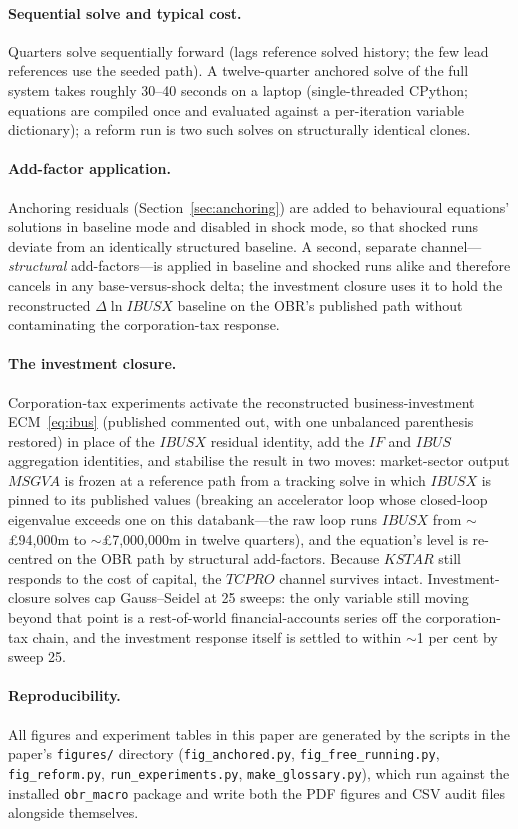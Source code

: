 \paragraph{Sequential solve and typical cost.} Quarters solve sequentially forward (lags reference solved history; the few lead references use the seeded path). A twelve-quarter anchored solve of the full system takes roughly 30--40 seconds on a laptop (single-threaded CPython; equations are compiled once and evaluated against a per-iteration variable dictionary); a reform run is two such solves on structurally identical clones.

\paragraph{Add-factor application.} Anchoring residuals (Section~\ref{sec:anchoring}) are added to behavioural equations' solutions in baseline mode and disabled in shock mode, so that shocked runs deviate from an identically structured baseline. A second, separate channel---\emph{structural} add-factors---is applied in baseline and shocked runs alike and therefore cancels in any base-versus-shock delta; the investment closure uses it to hold the reconstructed $\Delta \ln IBUSX$ baseline on the OBR's published path without contaminating the corporation-tax response.

\paragraph{The investment closure.} Corporation-tax experiments activate the reconstructed business-investment ECM~\eqref{eq:ibus} (published commented out, with one unbalanced parenthesis restored) in place of the $IBUSX$ residual identity, add the $IF$ and $IBUS$ aggregation identities, and stabilise the result in two moves: market-sector output $MSGVA$ is frozen at a reference path from a tracking solve in which $IBUSX$ is pinned to its published values (breaking an accelerator loop whose closed-loop eigenvalue exceeds one on this databank---the raw loop runs $IBUSX$ from $\sim$\pounds 94{,}000m to $\sim$\pounds 7{,}000{,}000m in twelve quarters), and the equation's level is re-centred on the OBR path by structural add-factors. Because $KSTAR$ still responds to the cost of capital, the $TCPRO$ channel survives intact. Investment-closure solves cap Gauss--Seidel at 25 sweeps: the only variable still moving beyond that point is a rest-of-world financial-accounts series off the corporation-tax chain, and the investment response itself is settled to within $\sim$1 per cent by sweep 25.

\paragraph{Reproducibility.} All figures and experiment tables in this paper are generated by the scripts in the paper's \texttt{figures/} directory (\texttt{fig\_anchored.py}, \texttt{fig\_free\_running.py}, \texttt{fig\_reform.py}, \texttt{run\_experiments.py}, \texttt{make\_glossary.py}), which run against the installed \texttt{obr\_macro} package and write both the PDF figures and CSV audit files alongside themselves.
